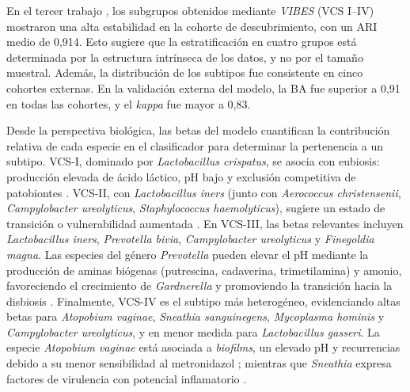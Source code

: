 En el tercer trabajo \cite{paper3}, los subgrupos obtenidos mediante \textit{VIBES} (VCS I–IV) mostraron una alta estabilidad en la cohorte de descubrimiento, con un ARI medio de 0,914. Esto sugiere que la estratificación en cuatro grupos está determinada por la estructura intrínseca de los datos, y no por el tamaño muestral. Además, la distribución de los subtipos fue consistente en cinco cohortes externas. En la validación externa del modelo, la BA fue superior a 0,91 en todas las cohortes, y el \textit{kappa} fue mayor a 0,83.

Desde la perspectiva biológica, las betas del modelo cuantifican la contribución relativa de cada especie en el clasificador para determinar la pertenencia a un subtipo. VCS-I, dominado por \textit{Lactobacillus crispatus}, se asocia con eubiosis: producción elevada de ácido láctico, pH bajo y exclusión competitiva de patobiontes \cite{ravel2011vaginal, srinivasan2012bacterial}. VCS-II, con \textit{Lactobacillus iners} (junto con \textit{Aerococcus christensenii}, \textit{Campylobacter ureolyticus}, \textit{Staphylococcus haemolyticus}), sugiere un estado de transición o vulnerabilidad aumentada \cite{macklaim2011crossroads, holm2023lactobacillus}. En VCS-III, las betas relevantes incluyen \textit{Lactobacillus iners}, \textit{Prevotella bivia}, \textit{Campylobacter ureolyticus} y \textit{Finegoldia magna}. Las especies del género \textit{Prevotella} pueden elevar el pH mediante la producción de aminas biógenas (putrescina, cadaverina, trimetilamina) y amonio, favoreciendo el crecimiento de \textit{Gardnerella} y promoviendo la transición hacia la disbiosis \cite{miller2016lactobacilli, yeoman2013multi}. Finalmente, VCS-IV es el subtipo más heterogéneo, evidenciando altas betas para \textit{Atopobium vaginae}, \textit{Sneathia sanguinegens}, \textit{Mycoplasma hominis} y \textit{Campylobacter ureolyticus}, y en menor medida para \textit{Lactobacillus gasseri}. La especie \textit{Atopobium vaginae} está asociada a \textit{biofilms}, un elevado pH y recurrencias debido a su menor sensibilidad al metronidazol \cite{swidsinski2008adherent, bradshaw2006association}; mientras que \textit{Sneathia} expresa factores de virulencia con potencial inflamatorio \cite{fredricks2005molecular, harwich2012genomic}.

